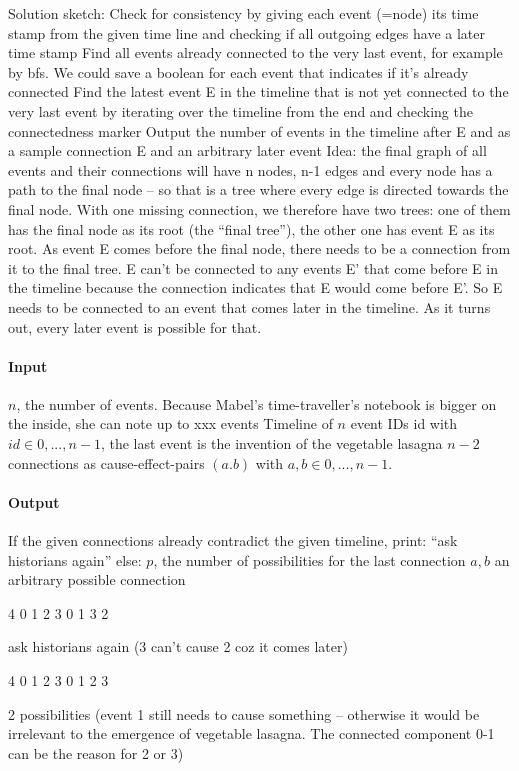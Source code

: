 Solution sketch:
Check for consistency by giving each event (=node) its time stamp from the given time line and checking if all outgoing edges have a later time stamp
Find all events already connected to the very last event, for example by bfs. We could save a boolean for each event that indicates if it’s already connected
Find the latest event E in the timeline that is not yet connected to the very last event by iterating over the timeline from the end and checking the connectedness marker
Output the number of events in the timeline after E and as a sample connection E and an arbitrary later event
Idea: the final graph of all events and their connections will have n nodes, n-1 edges and every node has a path to the final node – so that is a tree where every edge is directed towards the final node. With one missing connection, we therefore have two trees: one of them has the final node as its root (the “final tree”), the other one has event E as its root. As event E comes before the final node, there needs to be a connection from it to the final tree. E can’t be connected to any events E’ that come before E in the timeline because the connection indicates that E would come before E’. So E needs to be connected to an event that comes later in the timeline. As it turns out, every later event is possible for that.

\paragraph*{Input}

$n$, the number of events. Because Mabel's time-traveller’s notebook is bigger on the inside, she can note up to xxx events
Timeline of $n$ event IDs id with $id \in {0,...,n-1}$, the last event is the invention of the vegetable lasagna
$n-2$ connections as cause-effect-pairs $(a.b)$ with $a,b \in {0,...,n-1}$.

\paragraph*{Output}

If the given connections already contradict the given timeline, print: “ask historians again”
else:
$p$, the number of possibilities for the last connection
$a, b$ an arbitrary possible connection

\begin{samples}

    4
    0 1 2 3
    0 1
    3 2

    ask historians again (3 can’t cause 2 coz it comes later)


    4
    0 1 2 3
    0 1
    2 3

    2 possibilities
    (event 1 still needs to cause something – otherwise it would be irrelevant to the emergence of vegetable lasagna. The connected component 0-1 can be the reason for 2 or 3)

\end{samples}


